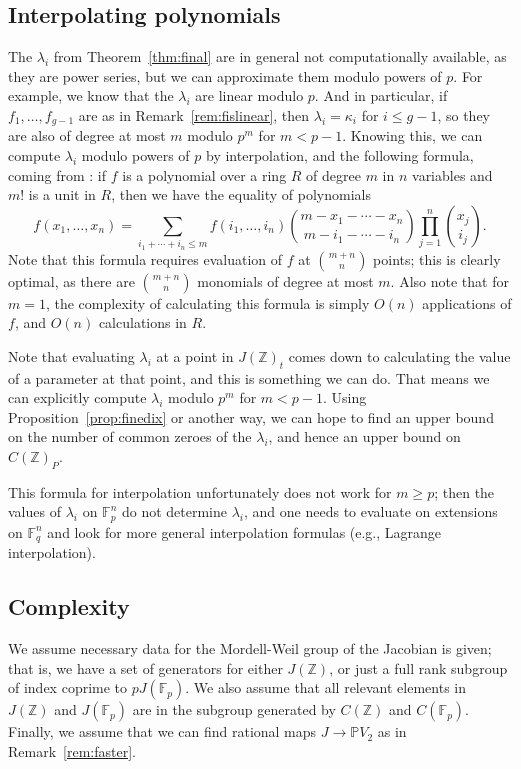 \documentclass[12pt]{article}
\newcommand{\Z}{\mathbb{Z}}
\renewcommand{\P}{\mathbb{P}}
\newcommand{\F}{\mathbb{F}}
\theoremstyle{plain}
\theoremstyle{definition}
\theoremstyle{remark}
\begin{document}
\subsection{Interpolating polynomials}
\label{subs:interpolate}
The $\lambda_i$ from Theorem~\ref{thm:final} are in general not computationally available, as they are power series, but we can approximate them modulo powers of $p$. For example, we know that the $\lambda_i$ are linear modulo $p$. And in particular, if $f_1,\dots,f_{g-1}$ are as in Remark~\ref{rem:fislinear}, then $\lambda_i = \kappa_i$ for $i \leq g-1$, so they are also of degree at most $m$ modulo $p^m$ for $m < p-1$. Knowing this, we can compute $\lambda_i$ modulo powers of $p$ by interpolation, and the following formula, coming from \cite{salzer}: if $f$ is a polynomial over a ring $R$ of degree $m$ in $n$ variables and $m!$ is a unit in $R$, then we have the equality of polynomials
\[
f(x_1,\dots,x_n) = \sum_{i_1 + \cdots + i_n \leq m} f(i_1,\dots,i_n) \binom{m-x_1-\cdots-x_n}{m-i_1-\cdots-i_n} \prod_{j=1}^n \binom{x_j}{i_j}.
\]
Note that this formula requires evaluation of $f$ at $\binom{m+n}{n}$ points; this is clearly optimal, as there are $\binom{m+n}{n}$ monomials of degree at most $m$. Also note that for $m=1$, the complexity of calculating this formula is simply $O(n)$ applications of $f$, and $O(n)$ calculations in $R$.

Note that evaluating $\lambda_i$ at a point in $J(\Z)_t$ comes down to calculating the value of a parameter at that point, and this is something we can do. That means we can explicitly compute $\lambda_i$ modulo $p^m$ for $m < p-1$. Using Proposition~\ref{prop:finedix} or another way, we can hope to find an upper bound on the number of common zeroes of the $\lambda_i$, and hence an upper bound on $C(\Z)_P$.

This formula for interpolation unfortunately does not work for $m \geq p$; then the values of $\lambda_i$ on $\F_p^{n}$ do not determine $\lambda_i$, and one needs to evaluate on extensions on $\F_q^n$ and look for more general interpolation formulas (e.g., Lagrange interpolation).

\subsection{Complexity}
We assume necessary data for the Mordell-Weil group of the Jacobian is given; that is, we have a set of generators for either $J(\Z)$, or just a full rank subgroup of index coprime to $pJ(\F_p)$. We also assume that all relevant elements in $J(\Z)$ and $J(\F_p)$ are in the subgroup generated by $C(\Z)$ and $C(\F_p)$. Finally, we assume that we can find rational maps $J \to \P V_2$ as in Remark~\ref{rem:faster}.
\end{document}
